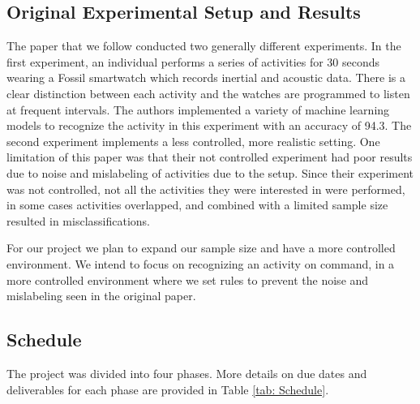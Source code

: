 \documentclass[conference]{IEEEtran}
\begin{document}
\subsection{Original Experimental Setup and Results}
The paper that we follow conducted two generally different experiments. In the first experiment, an individual performs a series of activities for 30 seconds wearing a Fossil smartwatch which records inertial and acoustic data. There is a clear distinction between each activity and the watches are programmed to listen at frequent intervals. The authors implemented a variety of machine learning models to recognize the activity in this experiment with an accuracy of 94.3. The second experiment implements a less controlled, more realistic setting.
One limitation of this paper was that their not controlled experiment had poor results due to noise and mislabeling of activities due to the setup.
Since their experiment was not controlled, not all the activities they were interested in were performed, in some cases activities overlapped, and combined with a limited sample size resulted in misclassifications.

For our project we plan to expand our sample size and have a more controlled environment.
We intend to focus on recognizing an activity on command, in a more controlled environment where we set rules to prevent the noise and mislabeling seen in the original paper.


\subsection{Schedule}
The project was divided into four phases.
More details on due dates and deliverables for each phase are provided in Table \ref{tab: Schedule}.
\end{document}
